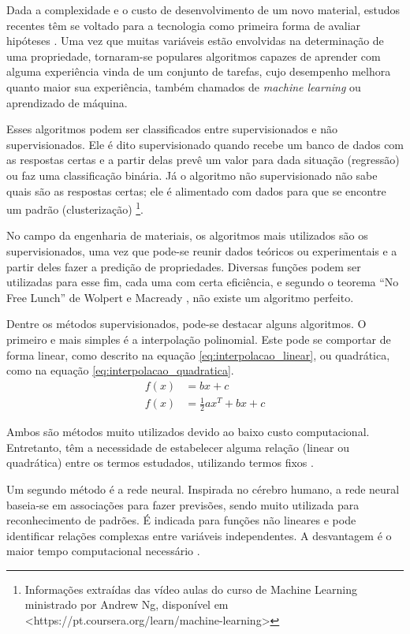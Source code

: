 \documentclass[brazil,tese,epusp]{usp}
\begin{document}
Dada a complexidade e o custo de desenvolvimento de um novo material, estudos recentes têm se voltado para a tecnologia como primeira forma de avaliar hipóteses \cite{Belisle2015}. Uma vez que muitas variáveis estão envolvidas na determinação de uma propriedade, tornaram-se populares algoritmos capazes de aprender com alguma experiência vinda de um conjunto de tarefas,  cujo desempenho melhora quanto maior sua experiência, também chamados de \textit{machine learning} ou aprendizado de máquina.

Esses algoritmos podem ser classificados entre supervisionados e não supervisionados. Ele é dito supervisionado quando recebe um banco de dados com as respostas certas e a partir delas prevê um valor para dada situação (regressão) ou faz uma classificação binária. Já o algoritmo não supervisionado não sabe quais são as respostas certas; ele é alimentado com dados para que se encontre um padrão (clusterização) \footnote{Informações extraídas das vídeo aulas do curso de Machine Learning ministrado por Andrew Ng, disponível em <https://pt.coursera.org/learn/machine-learning>}.

No campo da engenharia de materiais, os algoritmos mais utilizados são os supervisionados, uma vez que pode-se reunir dados teóricos ou experimentais e a partir deles fazer a predição de propriedades. Diversas funções podem ser utilizadas para esse fim, cada uma com certa eficiência, e segundo o teorema ``No Free Lunch'' de Wolpert e Macready  , não existe um algoritmo perfeito.

Dentre os métodos supervisionados, pode-se destacar alguns algoritmos. O primeiro e mais simples é a interpolação polinomial. Este pode se comportar de forma linear, como descrito na equação \ref{eq:interpolacao_linear}, ou quadrática, como na equação \ref{eq:interpolacao_quadratica}.
\begin{align}
  f(x) &= b x + c \label{eq:interpolacao_linear} \\
  f(x) &= \frac{1}{2} a x^T + b x + c \label{eq:interpolacao_quadratica}
\end{align}

Ambos são métodos muito utilizados devido ao baixo custo computacional. Entretanto, têm a necessidade de estabelecer alguma relação (linear ou quadrática) entre os termos estudados, utilizando termos fixos \cite{Bhadeshia1999}.

Um segundo método é a rede neural. Inspirada no cérebro humano, a rede neural baseia-se em associações para fazer previsões, sendo muito utilizada para reconhecimento de padrões. É indicada para funções não lineares e pode identificar relações complexas entre variáveis independentes. A desvantagem é o maior tempo computacional necessário \cite{Belisle2015}.
\end{document}
